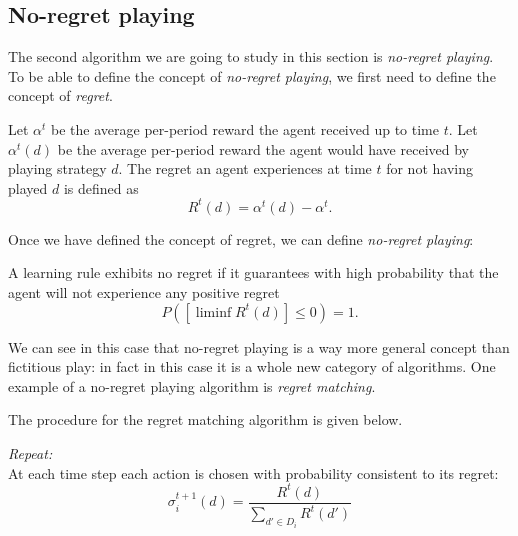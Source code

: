 \subsection{No-regret playing}
The second algorithm we are going to study in this section is \emph{no-regret
playing}. To be able to define the concept of \emph{no-regret playing}, we
first need to define the concept of \emph{regret}.

\begin{definition}[Regret]
    Let $\alpha^t$ be the average per-period reward the agent received up to time
    $t$. Let $\alpha^t(d)$ be the average per-period reward the agent would have
    received by playing strategy $d$. The regret an agent experiences at
    time $t$ for not having played $d$ is defined as
    $$R^t(d) = \alpha^t(d) - \alpha^t.$$
\end{definition}

Once we have defined the concept of regret, we can define \emph{no-regret playing}:

\begin{definition}
    A learning rule exhibits no regret if it guarantees with high probability that
    the agent will not experience any positive regret\\ $$P([\liminf R^t(d)]
    \leq 0) = 1.$$
\end{definition}

We can see in this case that no-regret playing is a way more general concept
than fictitious play: in fact in this case it is a whole new category of
algorithms. One example of a no-regret playing algorithm is \emph{regret
matching}. 

The procedure for the regret matching algorithm is given below.

\begin{procedure}
    \emph{Repeat:\\}
	\quad At each time step each action is chosen with probability consistent to its regret:\\
			$$\sigma_i^{t+1}(d)= \frac{R^t(d)}{\sum_{d'\in D_i} R^t(d')}$$
    \label{chap9:regretmatchproc}
\end{procedure}



\ifx \globalmark \undefined %


	
\else

\fi
